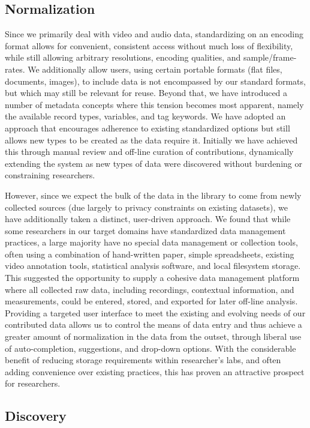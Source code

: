 \documentclass{sig-alternate}
\begin{document}
\subsection{Normalization}

Since we primarily deal with video and audio data, standardizing on an encoding format allows for convenient, consistent access without much loss of flexibility, while still allowing arbitrary resolutions, encoding qualities, and sample/frame-rates.
We additionally allow users, using certain portable formats (flat files, documents, images), to include data is not encompassed by our standard formats, but which may still be relevant for reuse.
Beyond that, we have introduced a number of metadata concepts where this tension becomes most apparent, namely the available record types, variables, and tag keywords.
We have adopted an approach that encourages adherence to existing standardized options but still allows new types to be created as the data require it.
Initially we have achieved this through manual review and off-line curation of contributions, dynamically extending the system as new types of data were discovered without burdening or constraining researchers.

However, since we expect the bulk of the data in the library to come from newly collected sources (due largely to privacy constraints on existing datasets), we have additionally taken a distinct, user-driven approach.
We found that while some researchers in our target domains have standardized data management practices, a large majority have no special data management or collection tools, often using a combination of hand-written paper, simple spreadsheets, existing video annotation tools, statistical analysis software, and local filesystem storage.
This suggested the opportunity to supply a cohesive data management platform where all collected raw data, including recordings, contextual information, and measurements, could be entered, stored, and exported for later off-line analysis.
Providing a targeted user interface to meet the existing and evolving needs of our contributed data allows us to control the means of data entry and thus achieve a greater amount of normalization in the data from the outset, through liberal use of auto-completion, suggestions, and drop-down options.
With the considerable benefit of reducing storage requirements within researcher's labs, and often adding convenience over existing practices, this has proven an attractive prospect for researchers.

\subsection{Discovery}
\end{document}

